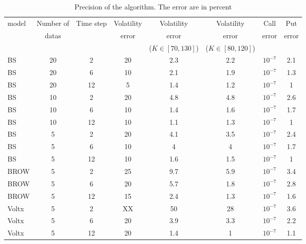 \documentclass[a4paper]{article}
\begin{document}
\begin{table}[htbp]
\begin{center}
\begin{footnotesize}
  \begin{tabular}{|l | c | c | c | c |  c |c |c|}
  \hline
  {  model} & Number of & {  Time step} &  { Volatility} &
  Volatility & Volatility & Call & Put \\
   & datas & & error & error & error & error & error \\
   & & & & ($K\in[70,130]$) &  { ($K\in[80,120]$)} & & \\ \hline
    BS & 20  & 2 & 20 & 2.3 & 2.2 & $10^{-7}$& 2.1 \\ \hline
     BS & 20  & 6 & 10 & 2.1 & 1.9 & $10^{-7}$& 1.3 \\ \hline
     BS & 20  & 12 & 5 & 1.4 & 1.2 & $10^{-7}$& 1 \\ \hline
     BS & 10  & 2 & 20 & 4.8 & 4.8 & $10^{-7}$& 2.6 \\ \hline
     BS & 10  & 6 & 10 & 1.4 & 1.6 & $10^{-7}$& 1.7 \\ \hline
     BS & 10  & 12 & 10 & 1.1 & 1.3 & $10^{-7}$& 1 \\ \hline
     BS & 5  & 2 & 20 & 4.1 & 3.5 & $10^{-7}$& 2.4 \\ \hline
     BS & 5  & 6 & 10 & 4 & 4 & $10^{-7}$& 1.7 \\ \hline
     BS & 5  & 12 & 10 & 1.6 & 1.5 & $10^{-7}$& 1 \\ \hline
      BROW & 5  & 2 & 25 & 9.7 & 5.9 & $10^{-7}$& 3.4 \\ \hline
     BROW & 5  & 6 & 20 & 5.7 & 1.8 & $10^{-7}$& 2.8 \\ \hline
      BROW & 5  & 12 & 15 & 2.4 & 1.3 & $10^{-7}$& 1.6 \\ \hline
     Voltx & 5  & 2 & XX & 50 & 28 & $10^{-7}$& 3.6 \\ \hline
     Voltx & 5  & 6 & 20 & 3.9 & 3.3 & $10^{-7}$& 2.2 \\ \hline
    Voltx & 5  & 12 & 20 & 1.4 & 1 & $10^{-7}$& 1.1 \\ \hline
  \end{tabular}
  \end{footnotesize}
  \caption{Precision of the algorithm. The error are in percent\label{prec}}
\end{center}
\end{table}
\end{document}
